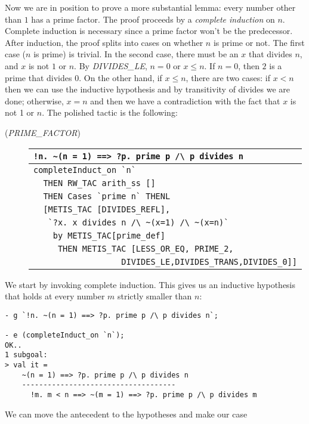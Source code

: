 Now we are in position to prove a more substantial lemma: every number
other than $1$ has a prime factor. The proof proceeds by a
\emph{complete induction} on $n$. Complete induction is
necessary since a prime factor won't be the predecessor. After
induction, the proof splits into cases on whether $n$ is prime or
not. The first case ($n$ is prime) is
trivial. In the second case, there must be an $x$ that divides $n$, and
$x$ is not $1$ or $n$. By {\small\it DIVIDES\_LE}, $n=0$ or $x \leq n$. If
$n=0$, then $2$ is a prime that divides $0$. On the other hand, if $x \leq
n$, there are two cases: if $x < n$ then we can use the inductive
hypothesis and by transitivity of divides we are done; otherwise,
$x=n$ and then we have a contradiction with the fact that $x$ is not 1
or $n$.  The polished tactic is the following:
\begin{description}
\item [\small{({\it PRIME\_FACTOR\/})}]
\begin{tabular}[t]{l}
\verb+!n. ~(n = 1) ==> ?p. prime p /\ p divides n+ \\ \hline
\verb+completeInduct_on `n`+ \\
\verb+  THEN RW_TAC arith_ss []+ \\
\verb+  THEN Cases `prime n` THENL+ \\
\verb+  [METIS_TAC [DIVIDES_REFL], + \\
\verb+   `?x. x divides n /\ ~(x=1) /\ ~(x=n)` + \\
\verb+    by METIS_TAC[prime_def]+ \\
\verb+     THEN METIS_TAC [LESS_OR_EQ, PRIME_2, +\\
\verb+                  DIVIDES_LE,DIVIDES_TRANS,DIVIDES_0]]+ \\
\end{tabular}
\end{description}
We start by invoking complete induction. This gives us an inductive
hypothesis that holds at every number $m$ strictly smaller than $n$:
\begin{session}
\begin{verbatim}
- g `!n. ~(n = 1) ==> ?p. prime p /\ p divides n`;

- e (completeInduct_on `n`);
OK..
1 subgoal:
> val it =
    ~(n = 1) ==> ?p. prime p /\ p divides n
    ------------------------------------
      !m. m < n ==> ~(m = 1) ==> ?p. prime p /\ p divides m
\end{verbatim}
\end{session}
We can move the antecedent to the hypotheses and make our case
